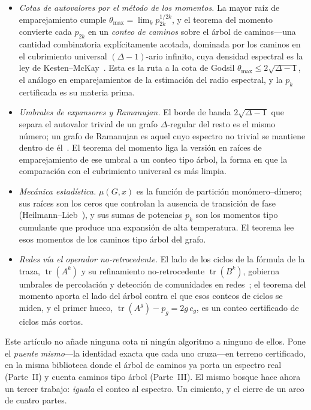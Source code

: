 \documentclass[11pt]{article}
\DeclareMathOperator{\tr}{tr}
\begin{document}
\begin{itemize}
\item \emph{Cotas de autovalores por el m\'etodo de los momentos.} La mayor ra\'iz de emparejamiento
cumple $\theta_{\max}=\lim_k p_{2k}^{1/2k}$, y el teorema del momento convierte cada $p_{2k}$ en un
\emph{conteo de caminos} sobre el \'arbol de caminos---una cantidad combinatoria expl\'icitamente acotada,
dominada por los caminos en el cubrimiento universal $(\Delta-1)$-ario infinito, cuya densidad
espectral es la ley de Kesten--McKay~\cite{McKay,AngelFriedmanHoory}. Esta es la ruta a la cota de
Godsil $\theta_{\max}\le2\sqrt{\Delta-1}$, el an\'alogo en emparejamientos de la estimaci\'on del radio
espectral, y la $p_k$ certificada es su materia prima.
\item \emph{Umbrales de expansores y Ramanujan.} El borde de banda $2\sqrt{\Delta-1}$ que separa el
autovalor trivial de un grafo $\Delta$-regular del resto es el mismo n\'umero; un grafo de Ramanujan
es aquel cuyo espectro no trivial se mantiene dentro de \'el~\cite{MSS}. El teorema del momento liga la
versi\'on en ra\'ices de emparejamiento de ese umbral a un conteo tipo \'arbol, la forma en que la
comparaci\'on con el cubrimiento universal es m\'as limpia.
\item \emph{Mec\'anica estad\'istica.} $\mu(G,x)$ es la funci\'on de partici\'on mon\'omero--d\'imero;
sus ra\'ices son los ceros que controlan la ausencia de transici\'on de fase
(Heilmann--Lieb~\cite{HeilmannLieb}), y sus sumas de potencias $p_k$ son los momentos tipo cumulante
que produce una expansi\'on de alta temperatura. El teorema lee esos momentos de los caminos tipo
\'arbol del grafo.
\item \emph{Redes v\'ia el operador no-retrocedente.} El lado de los ciclos de la f\'ormula de la
traza, $\tr(A^k)$ y su refinamiento no-retrocedente $\tr(B^k)$, gobierna umbrales de percolaci\'on y
detecci\'on de comunidades en redes~\cite{Hashimoto,IharaBass}; el teorema del momento aporta el lado
del \'arbol contra el que esos conteos de ciclos se miden, y el primer hueco,
$\tr(A^g)-p_g=2g\,c_g$, es un conteo certificado de ciclos m\'as cortos.
\end{itemize}
Este art\'iculo no a\~nade ninguna cota ni ning\'un algoritmo a ninguno de ellos. Pone el \emph{puente
mismo}---la identidad exacta que cada uno cruza---en terreno certificado, en la misma biblioteca donde
el \'arbol de caminos ya porta un espectro real (Parte~II) y cuenta caminos tipo \'arbol (Parte~III).
El mismo bosque hace ahora un tercer trabajo: \emph{iguala} el conteo al espectro. Un cimiento, y el
cierre de un arco de cuatro partes.
\end{document}
